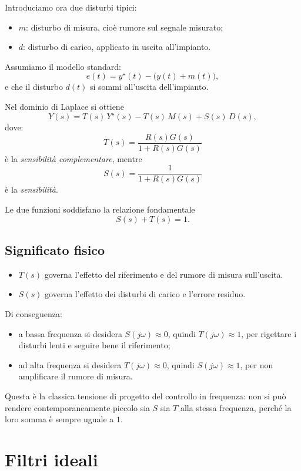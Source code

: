 Introduciamo ora due disturbi tipici:
\begin{itemize}
    \item \(m\): disturbo di misura, cioè rumore sul segnale misurato;
    \item \(d\): disturbo di carico, applicato in uscita all'impianto.
\end{itemize}

Assumiamo il modello standard:
\[
e(t)=y^\star(t)-\bigl(y(t)+m(t)\bigr),
\]
e che il disturbo \(d(t)\) si sommi all'uscita dell'impianto.

Nel dominio di Laplace si ottiene
\[
Y(s)=T(s)\,Y^\star(s)-T(s)\,M(s)+S(s)\,D(s),
\]
dove:
\[
T(s)=\frac{R(s)G(s)}{1+R(s)G(s)}
\]
è la \emph{sensibilità complementare}, mentre
\[
S(s)=\frac{1}{1+R(s)G(s)}
\]
è la \emph{sensibilità}.

Le due funzioni soddisfano la relazione fondamentale
\[
S(s)+T(s)=1.
\]

\subsection{Significato fisico}

\begin{itemize}
    \item \(T(s)\) governa l'effetto del riferimento e del rumore di misura sull'uscita.
    \item \(S(s)\) governa l'effetto dei disturbi di carico e l'errore residuo.
\end{itemize}

Di conseguenza:
\begin{itemize}
    \item a bassa frequenza si desidera \(S(j\omega)\approx 0\), quindi \(T(j\omega)\approx 1\),
    per rigettare i disturbi lenti e seguire bene il riferimento;
    \item ad alta frequenza si desidera \(T(j\omega)\approx 0\), quindi \(S(j\omega)\approx 1\),
    per non amplificare il rumore di misura.
\end{itemize}

Questa è la classica tensione di progetto del controllo in frequenza:
non si può rendere contemporaneamente piccolo sia \(S\) sia \(T\) alla stessa frequenza,
perché la loro somma è sempre uguale a \(1\).

\section{Filtri ideali}

